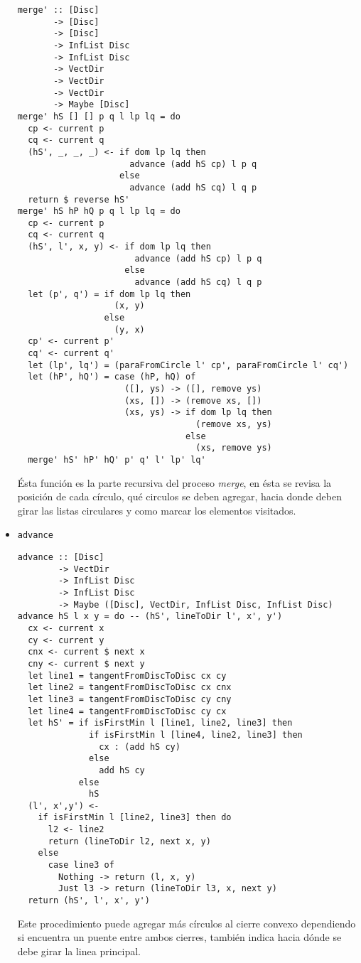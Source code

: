 \documentclass[12pt]{article}
\begin{document}
\begin{itemize}
  \begin{verbatim}
merge' :: [Disc]
       -> [Disc]
       -> [Disc]
       -> InfList Disc
       -> InfList Disc
       -> VectDir
       -> VectDir
       -> VectDir
       -> Maybe [Disc]
merge' hS [] [] p q l lp lq = do
  cp <- current p
  cq <- current q
  (hS', _, _, _) <- if dom lp lq then
                      advance (add hS cp) l p q
                    else
                      advance (add hS cq) l q p
  return $ reverse hS'
merge' hS hP hQ p q l lp lq = do
  cp <- current p
  cq <- current q
  (hS', l', x, y) <- if dom lp lq then
                       advance (add hS cp) l p q
                     else
                       advance (add hS cq) l q p
  let (p', q') = if dom lp lq then
                   (x, y)
                 else
                   (y, x)
  cp' <- current p'
  cq' <- current q'
  let (lp', lq') = (paraFromCircle l' cp', paraFromCircle l' cq')
  let (hP', hQ') = case (hP, hQ) of
                     ([], ys) -> ([], remove ys)
                     (xs, []) -> (remove xs, [])
                     (xs, ys) -> if dom lp lq then
                                   (remove xs, ys)
                                 else
                                   (xs, remove ys)
  merge' hS' hP' hQ' p' q' l' lp' lq'
  \end{verbatim}

  Ésta función es la parte recursiva del proceso \textit{merge}, en ésta se revisa la posición de cada círculo, qué circulos se deben agregar, hacia donde deben girar las listas circulares y como marcar los elementos visitados.

\item \texttt{advance}

  \begin{verbatim}
advance :: [Disc]
        -> VectDir
        -> InfList Disc
        -> InfList Disc
        -> Maybe ([Disc], VectDir, InfList Disc, InfList Disc)
advance hS l x y = do -- (hS', lineToDir l', x', y')
  cx <- current x
  cy <- current y
  cnx <- current $ next x
  cny <- current $ next y
  let line1 = tangentFromDiscToDisc cx cy
  let line2 = tangentFromDiscToDisc cx cnx
  let line3 = tangentFromDiscToDisc cy cny
  let line4 = tangentFromDiscToDisc cy cx
  let hS' = if isFirstMin l [line1, line2, line3] then
              if isFirstMin l [line4, line2, line3] then
                cx : (add hS cy) 
              else
                add hS cy
            else
              hS
  (l', x',y') <-
    if isFirstMin l [line2, line3] then do
      l2 <- line2
      return (lineToDir l2, next x, y)
    else
      case line3 of
        Nothing -> return (l, x, y)
        Just l3 -> return (lineToDir l3, x, next y)
  return (hS', l', x', y')
  \end{verbatim}

  Este procedimiento puede agregar más círculos al cierre convexo dependiendo si encuentra un puente entre ambos cierres, también indica hacia dónde se debe girar la linea principal.

\end{itemize}
\end{document}
